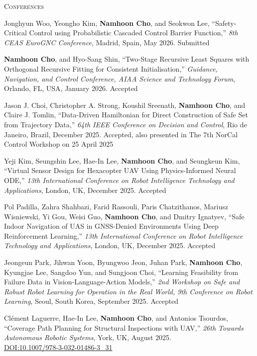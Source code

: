 \textsc{Conferences}
\vspace{0.5em}
\begin{enumerate}[itemsep=0.5em, label={[}C\arabic*{]}]
\item Jonghyun Woo, Yeongho Kim, \textbf{Namhoon Cho}, and Seokwon Lee, ``Safety-Critical Control using Probabilistic Cascaded Control Barrier Function,'' \textit{8th CEAS EuroGNC Conference}, Madrid, Spain, May 2026. Submitted 

\item \textbf{Namhoon Cho}, and Hyo-Sang Shin, ``Two-Stage Recursive Least Squares with Orthogonal Recursive Fitting for Consistent Initialisation,'' \textit{Guidance, Navigation, and Control Conference, AIAA Science and Technology Forum}, Orlando, FL, USA, January 2026. Accepted 

\item Jason J. Choi, Christopher A. Strong, Koushil Sreenath, \textbf{Namhoon Cho}, and Claire J. Tomlin, ``Data-Driven Hamiltonian for Direct Construction of Safe Set from Trajectory Data,'' \textit{64th IEEE Conference on Decision and Control}, Rio de Janeiro, Brazil, December 2025. Accepted, also presented in The 7th NorCal Control Workshop on 25 April 2025 

\item Yeji Kim, Seungshin Lee, Hae-In Lee, \textbf{Namhoon Cho}, and Seungkeun Kim, ``Virtual Sensor Design for Hexacopter UAV Using Physics-Informed Neural ODE,'' \textit{13th International Conference on Robot Intelligence Technology and Applications}, London, UK, December 2025. Accepted 

\item Pol Padilla, Zahra Shahbazi, Farid Rassouli, Paris Chatzithanos, Mariusz Wisniewski, Yi Gou, Weisi Guo, \textbf{Namhoon Cho}, and Dmitry Ignatyev, ``Safe Indoor Navigation of UAS in GNSS-Denied Environments Using Deep Reinforcement Learning,'' \textit{13th International Conference on Robot Intelligence Technology and Applications}, London, UK, December 2025. Accepted 

\item Jeongeun Park, Jihwan Yoon, Byungwoo Jeon, Juhan Park, \textbf{Namhoon Cho}, Kyungjae Lee, Sangdoo Yun, and Sungjoon Choi, ``Learning Feasibility from Failure Data in Vision-Language-Action Models,'' \textit{2nd Workshop on Safe and Robust Robot Learning for Operation in the Real World, 9th Conference on Robot Learning}, Seoul, South Korea, September 2025. Accepted 

\item Clément Laguerre, Hae-In Lee, \textbf{Namhoon Cho}, and Antonios Tsourdos, ``Coverage Path Planning for Structural Inspections with UAV,'' \textit{26th Towards Autonomous Robotic Systems}, York, UK, August 2025. \\
\href{https://doi.org/10.1007/978-3-032-01486-3_31}{DOI:10.1007/978-3-032-01486-3\_31}


\end{enumerate}
